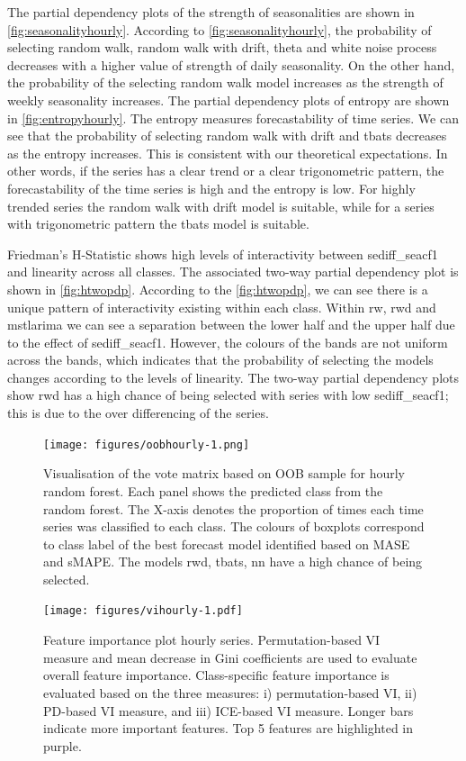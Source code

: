\documentclass[11pt,a4paper,]{article}
\begin{document}
The partial dependency plots of the strength of seasonalities are shown in \autoref{fig:seasonalityhourly}. According to \autoref{fig:seasonalityhourly}, the probability of selecting random walk, random walk with drift, theta and white noise process decreases with a higher value of strength of daily seasonality. On the other hand, the probability of the selecting random walk model increases as the strength of weekly seasonality increases. The partial dependency plots of entropy are shown in \autoref{fig:entropyhourly}. The entropy measures forecastability of time series. We can see that the probability of selecting random walk with drift and tbats decreases as the entropy increases. This is consistent with our theoretical expectations. In other words, if the series has a clear trend or a clear trigonometric pattern, the forecastability of the time series is high and the entropy is low. For highly trended series the random walk with drift model is suitable, while for a series with trigonometric pattern the tbats model is suitable.

Friedman's H-Statistic shows high levels of interactivity between sediff\_seacf1 and linearity across all classes. The associated two-way partial dependency plot is shown in \autoref{fig:htwopdp}. According to the \autoref{fig:htwopdp}, we can see there is a unique pattern of interactivity existing within each class. Within rw, rwd and mstlarima we can see a separation between the lower half and the upper half due to the effect of sediff\_seacf1. However, the colours of the bands are not uniform across the bands, which indicates that the probability of selecting the models changes according to the levels of linearity. The two-way partial dependency plots show rwd has a high chance of being selected with series with low sediff\_seacf1; this is due to the over differencing of the series.

\begin{figure}
\centering
\texttt{[image: figures/oobhourly-1.png]}
\caption{\label{fig:oobhourly}Visualisation of the vote matrix based on OOB sample for hourly random forest. Each panel shows the predicted class from the random forest. The X-axis denotes the proportion of times each time series was classified to each class. The colours of boxplots correspond to class label of the best forecast model identified based on MASE and sMAPE. The models rwd, tbats, nn have a high chance of being selected.}
\end{figure}

\begin{figure}
\centering
\texttt{[image: figures/vihourly-1.pdf]}
\caption{\label{fig:vihourly}Feature importance plot hourly series. Permutation-based VI measure and mean decrease in Gini coefficients are used to evaluate overall feature importance. Class-specific feature importance is evaluated based on the three measures: i) permutation-based VI, ii) PD-based VI measure, and iii) ICE-based VI measure. Longer bars indicate more important features. Top 5 features are highlighted in purple.}
\end{figure}
\end{document}
